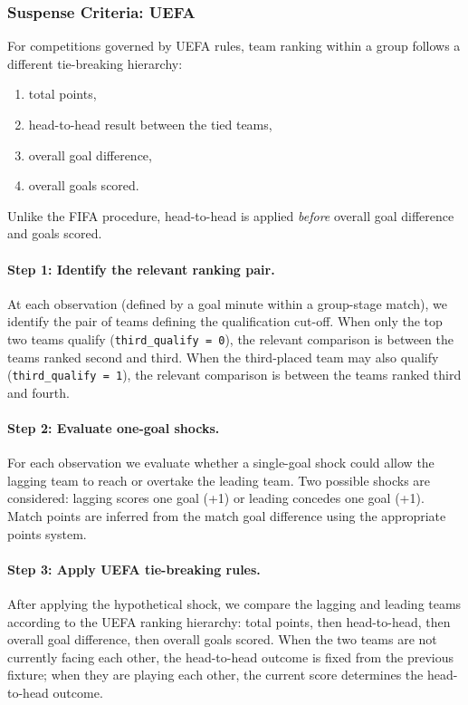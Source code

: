 \documentclass[11pt]{article}
\begin{document}
\subsubsection{Suspense Criteria: UEFA}
\label{sec:suspense-uefa-implemented}

For competitions governed by UEFA rules, team ranking within a group follows a different tie-breaking hierarchy:
\begin{enumerate}
    \item total points,
    \item head-to-head result between the tied teams,
    \item overall goal difference,
    \item overall goals scored.
\end{enumerate}
Unlike the FIFA procedure, head-to-head is applied \emph{before} overall goal difference and goals scored.

\paragraph{Step 1: Identify the relevant ranking pair.}
At each observation (defined by a goal minute within a group-stage match), we identify the pair of teams defining the qualification cut-off. When only the top two teams qualify (\texttt{third\_qualify = 0}), the relevant comparison is between the teams ranked second and third. When the third-placed team may also qualify (\texttt{third\_qualify = 1}), the relevant comparison is between the teams ranked third and fourth.

\paragraph{Step 2: Evaluate one-goal shocks.}
For each observation we evaluate whether a single-goal shock could allow the lagging team to reach or overtake the leading team. Two possible shocks are considered: lagging scores one goal (+1) or leading concedes one goal (+1). Match points are inferred from the match goal difference using the appropriate points system.

\paragraph{Step 3: Apply UEFA tie-breaking rules.}
After applying the hypothetical shock, we compare the lagging and leading teams according to the UEFA ranking hierarchy: total points, then head-to-head, then overall goal difference, then overall goals scored. When the two teams are not currently facing each other, the head-to-head outcome is fixed from the previous fixture; when they are playing each other, the current score determines the head-to-head outcome.
\end{document}
